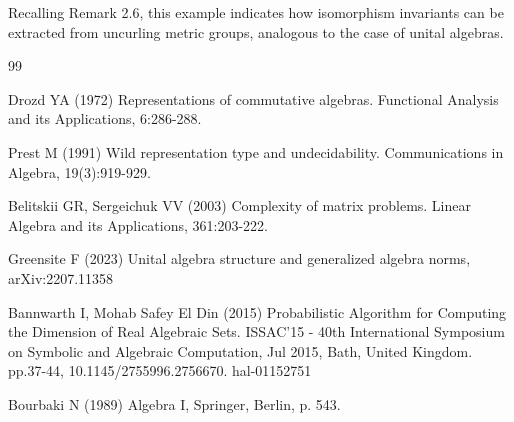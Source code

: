 \documentclass{amsart}
\numberwithin{equation}{section}
\theoremstyle{definition}
\numberwithin{theorem}{section}
\begin{document}
Recalling Remark 2.6, this example indicates how isomorphism invariants can be extracted from uncurling metric groups, analogous to the case of unital algebras. 
 
   \begin{thebibliography}{99}
   
     Drozd YA (1972) Representations of commutative algebras. Functional Analysis and its Applications, 6:286-288.
   
        Prest M (1991) Wild representation type and undecidability.  Communications in Algebra, 19(3):919-929.
       
        Belitskii GR, Sergeichuk VV (2003) Complexity of matrix problems.  Linear Algebra and its Applications, 361:203-222.
       
         Greensite F (2023) Unital algebra structure and generalized algebra norms, arXiv:2207.11358
               
     Bannwarth I, Mohab Safey El Din (2015) Probabilistic Algorithm for Computing the Dimension of Real Algebraic Sets. ISSAC’15 - 40th International Symposium on Symbolic and Algebraic Computation, Jul 2015, Bath, United Kingdom. pp.37-44, 10.1145/2755996.2756670. hal-01152751
 
   Bourbaki N (1989) Algebra I, Springer, Berlin, p. 543.

       
      \end{thebibliography}
   
   
\end{document}
